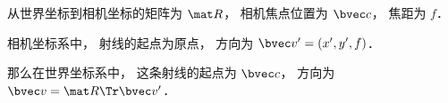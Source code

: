 

从世界坐标到相机坐标的矩阵为 $\mat R$， 相机焦点位置为 $\bvec c$， 焦距为 $f$．

相机坐标系中， 射线的起点为原点， 方向为 $\bvec v' = (x', y', f)$．

那么在世界坐标系中， 这条射线的起点为 $\bvec c$， 方向为 $\bvec v = \mat R\Tr \bvec v'$．
